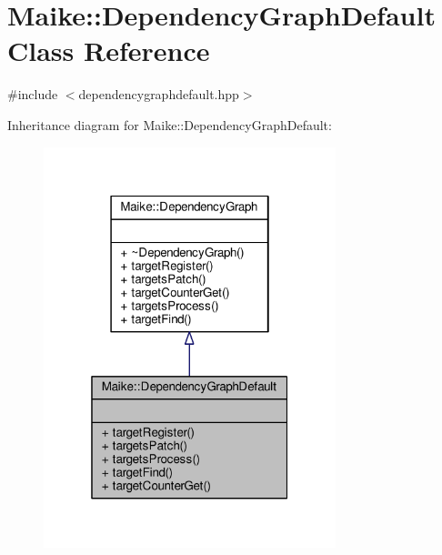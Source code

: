 \hypertarget{class_maike_1_1_dependency_graph_default}{}\section{Maike\+:\+:Dependency\+Graph\+Default Class Reference}
\label{class_maike_1_1_dependency_graph_default}


{\ttfamily \#include $<$dependencygraphdefault.\+hpp$>$}



Inheritance diagram for Maike\+:\+:Dependency\+Graph\+Default\+:\nopagebreak
\begin{figure}[H]
\begin{center}
\leavevmode
\includegraphics[width=241pt]{class_maike_1_1_dependency_graph_default__inherit__graph}
\end{center}
\end{figure}


